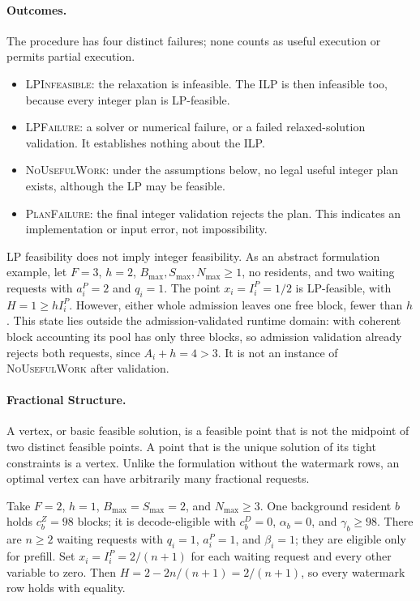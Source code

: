 \documentclass[11pt]{article}
\begin{document}
\paragraph{Outcomes.}
The procedure has four distinct failures; none counts as useful execution or permits partial execution.
\begin{itemize}
    \item \textsc{LPInfeasible}: the relaxation is infeasible. The ILP is then infeasible too, because every integer plan is LP-feasible.
    \item \textsc{LPFailure}: a solver or numerical failure, or a failed relaxed-solution validation. It establishes nothing about the ILP.
    \item \textsc{NoUsefulWork}: under the assumptions below, no legal useful integer plan exists, although the LP may be feasible.
    \item \textsc{PlanFailure}: the final integer validation rejects the plan. This indicates an implementation or input error, not impossibility.
\end{itemize}
LP feasibility does not imply integer feasibility. As an abstract formulation example, let \(F=3\), \(h=2\), \(B_{\max},S_{\max},N_{\max}\ge1\), no residents, and two waiting requests with \(a_i^P=2\) and \(q_i=1\). The point \(x_i=I_i^P=1/2\) is LP-feasible, with \(H=1\ge hI_i^P\). However, either whole admission leaves one free block, fewer than \(h\). This state lies outside the admission-validated runtime domain: with coherent block accounting its pool has only three blocks, so admission validation already rejects both requests, since \(A_i+h=4>3\). It is not an instance of \textsc{NoUsefulWork} after validation.

\paragraph{Fractional Structure.}
A vertex, or basic feasible solution, is a feasible point that is not the midpoint of two distinct feasible points. A point that is the unique solution of its tight constraints is a vertex. Unlike the formulation without the watermark rows, an optimal vertex can have arbitrarily many fractional requests.

Take \(F=2\), \(h=1\), \(B_{\max}=S_{\max}=2\), and \(N_{\max}\ge3\). One background resident \(b\) holds \(c_b^Z=98\) blocks; it is decode-eligible with \(c_b^D=0\), \(\alpha_b=0\), and \(\gamma_b\ge98\). There are \(n\ge2\) waiting requests with \(q_i=1\), \(a_i^P=1\), and \(\beta_i=1\); they are eligible only for prefill. Set \(x_i=I_i^P=2/(n+1)\) for each waiting request and every other variable to zero. Then \(H=2-2n/(n+1)=2/(n+1)\), so every watermark row holds with equality.
\end{document}
